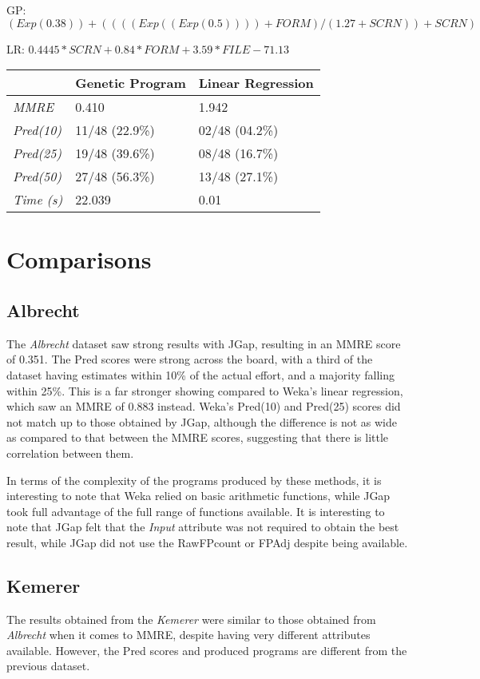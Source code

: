 \documentclass[11pt, a4paper]{article}
\begin{document}
GP: \((Exp(0.38)) + ((((Exp((Exp(0.5)))) + FORM) / (1.27 + SCRN)) + SCRN)\)

LR: \(0.4445 * SCRN + 0.84 * FORM + 3.59 * FILE - 71.13\)

\begin{tabularx}{\textwidth}{| l | X | X |}
\hline
 & \textbf{Genetic Program} & \textbf{Linear Regression} \\
\hline
\emph{MMRE} & 0.410 & 1.942 \\
\hline
\emph{Pred(10)} & 11/48 (22.9\%) & 02/48 (04.2\%) \\
\emph{Pred(25)} & 19/48 (39.6\%) & 08/48 (16.7\%) \\
\emph{Pred(50)} & 27/48 (56.3\%) & 13/48 (27.1\%) \\
\hline
\emph{Time (s)} & 22.039 & 0.01 \\
\hline
\end{tabularx}

\section{Comparisons} %
\label{sec:comparisons}
\subsection{Albrecht} %
\label{sub:albrecht_comp}
The \emph{Albrecht} dataset saw strong results with JGap, resulting in an MMRE
score of 0.351. The Pred scores were strong across the board, with a third of
the dataset having estimates within 10\% of the actual effort, and a majority
falling within 25\%. This is a far stronger showing compared to Weka's linear
regression, which saw an MMRE of 0.883 instead. Weka's Pred(10) and Pred(25)
scores did not match up to those obtained by JGap, although the difference is
not as wide as compared to that between the MMRE scores, suggesting that there
is little correlation between them.

In terms of the complexity of the programs produced by these methods, it is
interesting to note that Weka relied on basic arithmetic functions, while
JGap took full advantage of the full range of functions available. It is
interesting to note that JGap felt that the \emph{Input} attribute was not
required to obtain the best result, while JGap did not use the RawFPcount or
FPAdj despite being available.

\subsection{Kemerer} %
\label{sub:kemerer_comp}
The results obtained from the \emph{Kemerer} were similar to those obtained from
\emph{Albrecht} when it comes to MMRE, despite having very different attributes
available. However, the Pred scores and produced programs are different from the
previous dataset.
\end{document}
